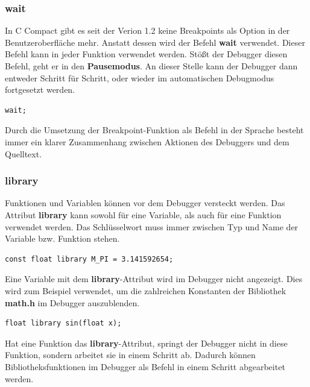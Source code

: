 \subsubsection*{wait}
In C Compact gibt es seit der Verion 1.2 keine Breakpoints als Option in der Benutzeroberfläche mehr. Anstatt dessen wird der Befehl \textbf{wait} verwendet. Dieser Befehl kann in jeder Funktion verwendet werden. Stößt der Debugger diesen Befehl, geht er in den \textbf{Pausemodus}. An dieser Stelle kann der Debugger dann entweder Schritt für Schritt, oder wieder im automatischen Debugmodus fortgesetzt werden.

\begin{lstlisting}[language=CMM]
wait;
\end{lstlisting}

Durch die Umsetzung der Breakpoint-Funktion als Befehl in der Sprache besteht immer ein klarer Zusammenhang zwischen Aktionen des Debuggers und dem Quelltext.

\subsubsection*{library}
Funktionen und Variablen können vor dem Debugger \glqq{}versteckt\grqq{} werden. Das Attribut \textbf{library} kann sowohl für eine Variable, als auch für eine Funktion verwendet werden. Das Schlüsselwort muss immer zwischen Typ und Name der Variable bzw. Funktion stehen.

\begin{lstlisting}[language=CMM]
const float library M_PI = 3.141592654;
\end{lstlisting}
Eine Variable mit dem \textbf{library}-Attribut wird im Debugger nicht angezeigt. Dies wird zum Beispiel verwendet, um die zahlreichen Konstanten der Bibliothek \textbf{math.h} im Debugger auszublenden.

\begin{lstlisting}[language=CMM]
float library sin(float x);
\end{lstlisting}
Hat eine Funktion das \textbf{library}-Attribut, springt der Debugger nicht in diese Funktion, sondern arbeitet sie in einem Schritt ab. Dadurch können Bibliotheksfunktionen im Debugger als Befehl in einem Schritt abgearbeitet werden.
